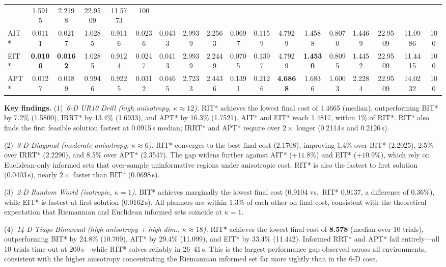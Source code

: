 \documentclass[journal]{IEEEtran}
\begin{document}
\begin{table}[t]
{\begin{tabular}{@{}l
  |cccc|cccc|cccc|cccc|
  c@{}}
 & 1.5915 & 2.2198 & 22.9509 & 11.5773
 & 100 \\
AIT*
 & 0.0111 & 0.0217 & 1.0285 & 0.9116
 & 0.0236 & 0.0433 & 2.9939 & 2.2563
 & 0.0697 & 0.1159 & 4.7929 & 1.4588
 & 0.8070 & 1.4469 & 22.9509 & 11.0986
 & 100 \\
EIT*
 & \textbf{0.0106} & \textbf{0.0162} & 1.0285 & 0.9124
 & 0.0247 & 0.0413 & 2.9939 & 2.2449
 & 0.0705 & 0.1397 & 4.7929 & \textbf{1.4530}
 & 0.8095 & 1.4452 & 22.9509 & 11.4415
 & 100 \\
APT*
 & 0.0127 & 0.0189 & 0.9946 & 0.9225
 & 0.0312 & 0.0465 & 2.7233 & 2.4436
 & 0.1391 & 0.2126 & \textbf{4.6868} & 1.6836
 & 1.6003 & 2.2284 & 22.9509 & 14.0232
 & 100 \\
\bottomrule
\end{tabular}}
\end{table}

\textbf{Key findings.}
(1)~\emph{6-D UR10 Drill (high anisotropy, $\kappa\approx12$).}
RIT* achieves the lowest final cost of 1.4665 (median), outperforming
BIT* by 7.2\% (1.5800), IRRT* by 13.4\% (1.6933), and APT* by 16.3\%
(1.7521). AIT* and EIT* reach 1.4817, within 1\% of RIT*.
RIT* also finds the first feasible solution fastest at 0.0915\,s
median; IRRT* and APT* require over $2\times$ longer (0.2114\,s and
0.2126\,s).

(2)~\emph{3-D Diagonal (moderate anisotropy, $\kappa\approx6$).}
RIT* converges to the best final cost (2.1708), improving 1.4\% over
BIT* (2.2025), 2.5\% over IRRT* (2.2290), and 8.5\% over APT*
(2.3547). The gap widens further against AIT* ($+11.8\%$) and EIT*
($+10.9\%$), which rely on Euclidean-only informed sets that over-sample
uninformative regions under anisotropic cost.
RIT* is also the fastest to first solution (0.0403\,s), nearly
$2\times$ faster than BIT* (0.0698\,s).

(3)~\emph{2-D Random World (isotropic, $\kappa=1$).}
BIT* achieves marginally the lowest final cost (0.9104 vs.\ RIT*
0.9137, a difference of 0.36\%), while EIT* is fastest at first
solution (0.0162\,s). All planners are within 1.3\% of each other on
final cost, consistent with the theoretical expectation that
Riemannian and Euclidean informed sets coincide at $\kappa=1$.

(4)~\emph{14-D Tiago Bimanual (high anisotropy + high dim., $\kappa\approx18$).}
RIT* achieves the lowest final cost of \textbf{8.578} (median over 10 trials),
outperforming BIT* by 24.8\% (10.709), AIT* by 29.4\% (11.099),
and EIT* by 33.4\% (11.442).
Informed RRT* and APT* fail entirely---all 10 trials time out at
200\,s---while RIT* solves reliably in 26--41\,s.
This is the largest performance gap observed across all environments,
consistent with the higher anisotropy concentrating the Riemannian
informed set far more tightly than in the 6-D case.
\end{document}
